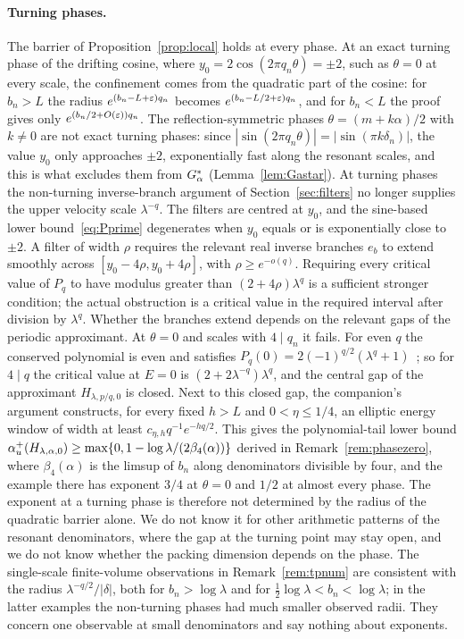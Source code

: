 \paragraph{Turning phases.} The barrier of Proposition~\ref{prop:local} holds at every phase. At an exact turning phase of the drifting cosine, where $y_0=2\cos(2\pi q_n\theta)=\pm2$, such as $\theta=0$ at every scale, the confinement comes from the quadratic part of the cosine: for $b_n>L$ the radius $e^{(b_n-L+\varepsilon)q_n}$ becomes $e^{(b_n-L/2+\varepsilon)q_n}$, and for $b_n<L$ the proof gives only $e^{(b_n/2+O(\varepsilon))q_n}$. The reflection-symmetric phases $\theta=(m+k\alpha)/2$ with $k\ne0$ are not exact turning phases: since $|\sin(2\pi q_n\theta)|=|\sin(\pi k\delta_n)|$, the value $y_0$ only approaches $\pm2$, exponentially fast along the resonant scales, and this is what excludes them from $G_\alpha^*$ (Lemma~\ref{lem:Gastar}). At turning phases the non-turning inverse-branch argument of Section~\ref{sec:filters} no longer supplies the upper velocity scale $\lambda^{-q}$. The filters are centred at $y_0$, and the sine-based lower bound~\eqref{eq:Pprime} degenerates when $y_0$ equals or is exponentially close to $\pm2$. A filter of width $\rho$ requires the relevant real inverse branches $e_b$ to extend smoothly across $[y_0-4\rho,y_0+4\rho]$, with $\rho\ge e^{-o(q)}$. Requiring every critical value of $P_q$ to have modulus greater than $(2+4\rho)\lambda^q$ is a sufficient stronger condition; the actual obstruction is a critical value in the required interval after division by $\lambda^q$. Whether the branches extend depends on the relevant gaps of the periodic approximant. At $\theta=0$ and scales with $4\mid q_n$ it fails. For even $q$ the conserved polynomial is even and satisfies $P_q(0)=2(-1)^{q/2}(\lambda^q+1)$~\cite[Corollary~7.2]{DMworstcase}; so for $4\mid q$ the critical value at $E=0$ is $(2+2\lambda^{-q})\lambda^q$, and the central gap of the approximant $H_{\lambda,p/q,0}$ is closed. Next to this closed gap, the companion's argument constructs, for every fixed $h>L$ and $0<\eta\le1/4$, an elliptic energy window of width at least $c_{\eta,h}q^{-1}e^{-hq/2}$. This gives the polynomial-tail lower bound $\alpha_u^+(H_{\lambda,\alpha,0})\ge\max\{0,1-\log\lambda/(2\beta_4(\alpha))\}$ derived in Remark~\ref{rem:phasezero}, where $\beta_4(\alpha)$ is the limsup of $b_n$ along denominators divisible by four, and the example there has exponent $3/4$ at $\theta=0$ and $1/2$ at almost every phase. The exponent at a turning phase is therefore not determined by the radius of the quadratic barrier alone. We do not know it for other arithmetic patterns of the resonant denominators, where the gap at the turning point may stay open, and we do not know whether the packing dimension depends on the phase. The single-scale finite-volume observations in Remark~\ref{rem:tpnum} are consistent with the radius $\lambda^{-q/2}/|\delta|$, both for $b_n>\log\lambda$ and for $\frac12\log\lambda<b_n<\log\lambda$; in the latter examples the non-turning phases had much smaller observed radii. They concern one observable at small denominators and say nothing about exponents.

